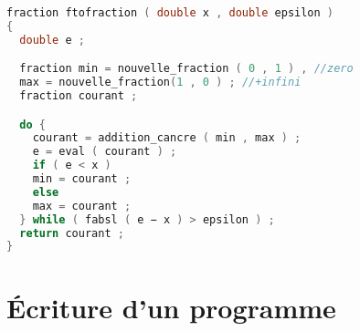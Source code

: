 \begin{solutioncachee}
  \begin{lstlisting}[language=C]
fraction ftofraction ( double x , double epsilon ) 
{ 
  double e ;

  fraction min = nouvelle_fraction ( 0 , 1 ) , //zero
  max = nouvelle_fraction(1 , 0 ) ; //+infini
  fraction courant ;

  do {
    courant = addition_cancre ( min , max ) ;
    e = eval ( courant ) ;
    if ( e < x )
    min = courant ;
    else
    max = courant ;
  } while ( fabsl ( e − x ) > epsilon ) ;
  return courant ;
}
\end{lstlisting}
\end{solutioncachee}



\section{Écriture d’un programme}

